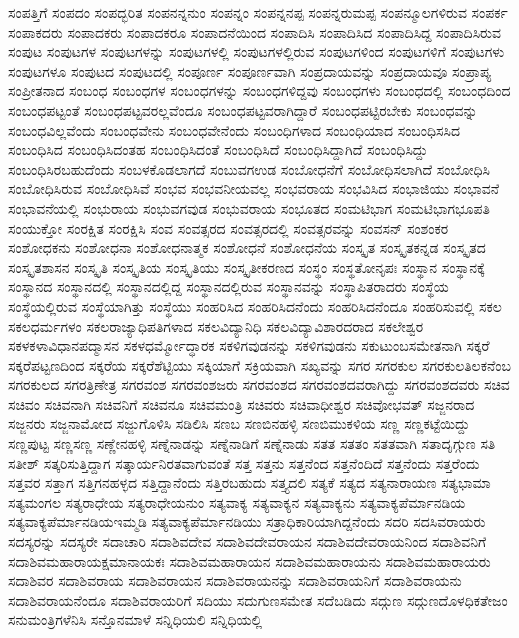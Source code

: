 {ಸಂಪತ್ತಿಗೆ
ಸಂಪದಂ
ಸಂಪದ್ಭರಿತ
ಸಂಪನನ್ನನುಂ
ಸಂಪನ್ನಂ
ಸಂಪನ್ನನಪ್ಪ
ಸಂಪನ್ನರುಮಪ್ಪ
ಸಂಪನ್ಮೂಲಗಳಿರುವ
ಸಂಪರ್ಕ
ಸಂಪಾಕದರು
ಸಂಪಾದಕರು
ಸಂಪಾದಕರೂ
ಸಂಪಾದನೆಯಿಂದ
ಸಂಪಾದಿಸಿ
ಸಂಪಾದಿಸಿದ
ಸಂಪಾದಿಸಿದ್ದ
ಸಂಪಾದಿಸಿರುವ
ಸಂಪುಟ
ಸಂಪುಟಗಳ
ಸಂಪುಟಗಳನ್ನು
ಸಂಪುಟಗಳಲ್ಲಿ
ಸಂಪುಟಗಳಲ್ಲಿರುವ
ಸಂಪುಟಗಳಿಂದ
ಸಂಪುಟಗಳಿಗೆ
ಸಂಪುಟಗಳು
ಸಂಪುಟಗಳೂ
ಸಂಪುಟದ
ಸಂಪುಟದಲ್ಲಿ
ಸಂಪೂರ್ಣ
ಸಂಪೂರ್ಣವಾಗಿ
ಸಂಪ್ರದಾಯವನ್ನು
ಸಂಪ್ರದಾಯವೂ
ಸಂಪ್ರಾಪ್ಯ
ಸಂಪ್ರೀತನಾದ
ಸಂಬಂಧ
ಸಂಬಂಧಗಳ
ಸಂಬಂಧಗಳನ್ನು
ಸಂಬಂಧಗಳಿದ್ದವು
ಸಂಬಂಧಗಳು
ಸಂಬಂಧದಲ್ಲಿ
ಸಂಬಂಧದಿಂದ
ಸಂಬಂಧಪಟ್ಟಂತೆ
ಸಂಬಂಧಪಟ್ಟವರಲ್ಲವೆಂದೂ
ಸಂಬಂಧಪಟ್ಟವರಾಗಿದ್ದಾರೆ
ಸಂಬಂಧಪಟ್ಟಿರಬೇಕು
ಸಂಬಂಧವನ್ನು
ಸಂಬಂಧವಿಲ್ಲವೆಂದು
ಸಂಬಂಧವೇನು
ಸಂಬಂಧವೇನೆಂದು
ಸಂಬಂಧಿಗಳಾದ
ಸಂಬಂಧಿಯಾದ
ಸಂಬಂಧಿಸಸಿದ
ಸಂಬಂಧಿಸಿದ
ಸಂಬಂಧಿಸಿದಂತಹ
ಸಂಬಂಧಿಸಿದಂತೆ
ಸಂಬಂಧಿಸಿದೆ
ಸಂಬಂಧಿಸಿದ್ದಾಗಿದೆ
ಸಂಬಂಧಿಸಿದ್ದು
ಸಂಬಂಧಿಸಿರಬಹುದೆಂದು
ಸಂಬಳಕೊಡಲಾಗದೆ
ಸಂಬುವಗಉಡ
ಸಂಬೋಧನೆಗೆ
ಸಂಬೋಧಿಸಲಾಗಿದೆ
ಸಂಬೋಧಿಸಿ
ಸಂಬೋಧಿಸಿರುವ
ಸಂಬೋಧಿಸಿವೆ
ಸಂಭವ
ಸಂಭವನೀಯವಲ್ಲ
ಸಂಭವರಾಯ
ಸಂಭವಿಸಿದ
ಸಂಭಾಜಿಯು
ಸಂಭಾವನೆ
ಸಂಭಾವನೆಯಲ್ಲಿ
ಸಂಭುರಾಯ
ಸಂಭುವಗವುಡ
ಸಂಭುವರಾಯ
ಸಂಭೂತದ
ಸಂಮಟಿಭಾಗ
ಸಂಮಟಿಭಾಗಭೂಪತಿ
ಸಂಯುಕ್ತೋ
ಸಂರಕ್ಷಿತ
ಸಂರಕ್ಷಿಸಿ
ಸಂವ
ಸಂವತ್ಸರದ
ಸಂವತ್ಸರದಲ್ಲಿ
ಸಂವತ್ಸರವನ್ನು
ಸಂವಸನ್
ಸಂಶಂಕರ
ಸಂಶೋಧಕನು
ಸಂಶೋಧನಾ
ಸಂಶೋಧನಾತ್ಮಕ
ಸಂಶೋಧನೆ
ಸಂಶೋಧನೆಯ
ಸಂಸ್ಕೃತ
ಸಂಸ್ಕೃತಕನ್ನಡ
ಸಂಸ್ಕೃತದ
ಸಂಸ್ಕೃತಶಾಸನ
ಸಂಸ್ಕೃತಿ
ಸಂಸ್ಕೃತಿಯ
ಸಂಸ್ಕೃತಿಯು
ಸಂಸ್ಕೃತೀಕರಣದ
ಸಂಸ್ಥಂ
ಸಂಸ್ಥತೋನೃಪಃ
ಸಂಸ್ಥಾನ
ಸಂಸ್ಥಾನಕ್ಕೆ
ಸಂಸ್ಥಾನದ
ಸಂಸ್ಥಾನದಲ್ಲಿ
ಸಂಸ್ಥಾನದಲ್ಲಿದ್ದ
ಸಂಸ್ಥಾನದಲ್ಲಿರುವ
ಸಂಸ್ಥಾನವನ್ನು
ಸಂಸ್ಥಾಪಿತರಾದರು
ಸಂಸ್ಥೆಯ
ಸಂಸ್ಥೆಯಲ್ಲಿರುವ
ಸಂಸ್ಥೆಯಾಗಿತ್ತು
ಸಂಸ್ಥೆಯು
ಸಂಹರಿಸಿದ
ಸಂಹರಿಸಿದನೆಂದು
ಸಂಹರಿಸಿದನೆಂದೂ
ಸಂಹರಿಸುವಲ್ಲಿ
ಸಕಲ
ಸಕಲಧರ್ಮಗಳಂ
ಸಕಲರಾಜ್ಯಾಧಿಪತಿಗಳಾದ
ಸಕಲವಿದ್ಯಾನಿಧಿ
ಸಕಲವಿದ್ಯಾವಿಶಾರದರಾದ
ಸಕಲೇಶ್ವರ
ಸಕಳಕಳಾವಿಧಾನಪದ್ಮಾಸನ
ಸಕಳಧರ್ಮ್ಮೋದ್ಧಾರಕ
ಸಕಳಿಗವುಡನನ್ನು
ಸಕಳಿಗವುಡನು
ಸಕುಟುಂಬಸಮೇತನಾಗಿ
ಸಕ್ಕರೆ
ಸಕ್ಕರೆಪಟ್ಟಣದಿಂದ
ಸಕ್ಕರೆಯ
ಸಕ್ಕರೆಶೆಟ್ಟಿಯು
ಸಕ್ಕಿಯಾಗೆ
ಸಕ್ರಿಯವಾಗಿ
ಸಖ್ಯವನ್ನು
ಸಗರ
ಸಗರಕುಲ
ಸಗರಕುಲತಿಲಕನೆಂಬ
ಸಗರಕುಲದ
ಸಗರತ್ರಿಣೇತ್ರ
ಸಗರವಂಶ
ಸಗರವಂಶಜರು
ಸಗರವಂಶದ
ಸಗರವಂಶದವರಾಗಿದ್ದು
ಸಗರವಂಶದವರು
ಸಚಿವ
ಸಚಿವಂ
ಸಚಿವನಾಗಿ
ಸಚಿವನಿಗೆ
ಸಚಿವನೂ
ಸಚಿವಮಂತ್ರಿ
ಸಚಿವರು
ಸಚಿವಾಧೀಶ್ವರ
ಸಚಿವೋಭವತ್
ಸಜ್ಜನರಾದ
ಸಜ್ಜನರು
ಸಜ್ಜನಾಮೋದ
ಸಜ್ಜುಗೊಳಿಸಿ
ಸಡಿಲಿಸಿ
ಸಣಬ
ಸಣಬಿನಹಳ್ಳಿ
ಸಣಬಿಮುಕಳಿಯ
ಸಣ್ಣ
ಸಣ್ಣಕಟ್ಟೆಯಿದ್ದು
ಸಣ್ಣಪುಟ್ಟ
ಸಣ್ಣಸಣ್ಣ
ಸಣ್ಣೇನಹಳ್ಳಿ
ಸಣ್ನೆನಾಡನ್ನು
ಸಣ್ನೆನಾಡಿಗೆ
ಸಣ್ನೆನಾಡು
ಸತತ
ಸತತಂ
ಸತತವಾಗಿ
ಸತಾದೃಗ್ಗುಣ
ಸತಿ
ಸತೀಶ್
ಸತ್ಕರಿಸುತ್ತಿದ್ದಾಗ
ಸತ್ಕಾರ್ಯನಿರತವಾಗುವಂತೆ
ಸತ್ತ
ಸತ್ತನು
ಸತ್ತನೆಂದ
ಸತ್ತನೆಂದಿದೆ
ಸತ್ತನೆಂದು
ಸತ್ತರೆಂದು
ಸತ್ತವರ
ಸತ್ತಾಗ
ಸತ್ತಿಗನಹಳ್ಳದ
ಸತ್ತಿದ್ದಾನೆಂದು
ಸತ್ತಿರಬಹುದು
ಸತ್ತ್ಯದಲಿ
ಸತ್ಯಕೆ
ಸತ್ಯದ
ಸತ್ಯನಾರಾಯಣ
ಸತ್ಯಭಾಮಾ
ಸತ್ಯಮಂಗಲ
ಸತ್ಯರಾಧೇಯ
ಸತ್ಯರಾಧೇಯನುಂ
ಸತ್ಯವಾಕ್ಯ
ಸತ್ಯವಾಕ್ಯನ
ಸತ್ಯವಾಕ್ಯನು
ಸತ್ಯವಾಕ್ಯಪೆರ್ಮಾನಡಿಯ
ಸತ್ಯವಾಕ್ಯಪೆರ್ಮಾನಡಿಯಇಮ್ಮಡಿ
ಸತ್ಯವಾಕ್ಯಪೆರ್ಮಾನಡಿಯು
ಸತ್ರಾಧಿಕಾರಿಯಾಗಿದ್ದನೆಂದು
ಸದರಿ
ಸದಸಿವರಾಯರು
ಸದಸ್ಯರನ್ನು
ಸದಸ್ಯರೇ
ಸದಾಚಾರಿ
ಸದಾಶಿವದೇವ
ಸದಾಶಿವದೇವರಾಯನ
ಸದಾಶಿವದೇವರಾಯನಿಂದ
ಸದಾಶಿವನಿಗೆ
ಸದಾಶಿವಮಹಾರಾಯಕ್ಷಮಾನಾಯಕಃ
ಸದಾಶಿವಮಹಾರಾಯನ
ಸದಾಶಿವಮಹಾರಾಯನು
ಸದಾಶಿವಮಹಾರಾಯರು
ಸದಾಶಿವರ
ಸದಾಶಿವರಾಯ
ಸದಾಶಿವರಾಯನ
ಸದಾಶಿವರಾಯನನ್ನು
ಸದಾಶಿವರಾಯನಿಗೆ
ಸದಾಶಿವರಾಯನು
ಸದಾಶಿವರಾಯನೆಂದೂ
ಸದಾಶಿವರಾಯರಿಗೆ
ಸದಿಯು
ಸದುಗುಣಸಮೇತ
ಸದೆಬಡಿದು
ಸದ್ಗುಣ
ಸದ್ಗುಣದೊಳಧಿಕತೇಜಂ
ಸನುಮಂತ್ರಿಗಳೆನಿಸಿ
ಸನ್ತೊನಮಾಳೆ
ಸನ್ನಿಧಿಯಲಿ
ಸನ್ನಿಧಿಯಲ್ಲಿ
}
